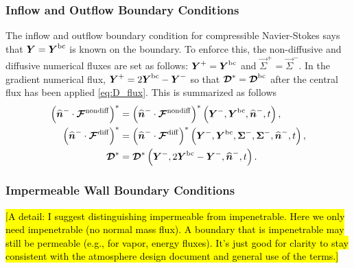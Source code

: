 \documentclass{report}
\begin{document}
\subsubsection{Inflow and Outflow Boundary Conditions}
The inflow and outflow boundary condition for compressible Navier-Stokes says
that $\vec{Y} = \vec{Y}^{\rm bc}$ is known on the boundary. To enforce this, the
non-diffusive and diffusive numerical fluxes are set as follows: $\vec{Y}^{+} = \vec{Y}^{\rm bc}$ and $\vec{\Sigma}^{+} = \vec{\Sigma}^{-}$. 
In the gradient
numerical flux, $\vec{Y}^{+} = 2\vec{Y}^{\rm bc} - \vec{Y}^{-}$ so that
$\diffusive^{*} = \diffusive^{\rm bc}$ after the central flux has been applied \eqref{eq:D_flux}.
This is summarized as follows
\begin{align}
  {\left( \nhat^{-} \cdot \Fnondiff\right)}^{*} &=
  {\left( \nhat^{-} \cdot \Fnondiff\right)}^{*}
  \left(\vec{Y}^{-}, \vec{Y}^{\rm bc}, \nhat^{-}, t\right),\\
  {\left( \nhat^{-} \cdot \Fdiff\right)}^{*} &=
  {\left( \nhat^{-} \cdot \Fdiff\right)}^{*}
  \left(\vec{Y}^{-}, \vec{Y}^{\rm bc}, \vec{\Sigma}^{-}, \vec{\Sigma}^{-},
  \nhat^{-}, t\right),\\
  \diffusive^{*} &=
  \diffusive^{*}
  \left(\vec{Y}^{-}, 2\vec{Y}^{\rm bc}-\vec{Y}^{-}, \nhat^{-}, t\right).
\end{align}

\subsubsection{Impermeable Wall Boundary Conditions}

\hl{[A detail: I suggest distinguishing impermeable from impenetrable. Here we only need impenetrable (no normal mass flux). A boundary that is impenetrable may still be permeable (e.g., for vapor, energy fluxes). It's just good for clarity to stay consistent with the atmosphere design document and general use of the terms.]}
\end{document}
